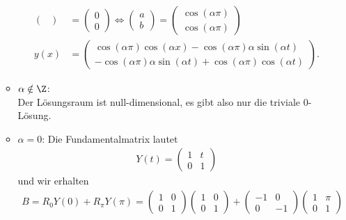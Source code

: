 \begin{solution}
\begin{enumerate}[label = \textbf{\alph*)}]
\begin{itemize}
\begin{align*}
\begin{pmatrix}
        \end{pmatrix}
        &= \begin{pmatrix}
          0 \\ 0
        \end{pmatrix} \iff
        \begin{pmatrix}
          a \\ b
        \end{pmatrix}
        = \begin{pmatrix}
          \cos(\alpha \pi) \\ \cos(\alpha \pi)
        \end{pmatrix}\\
        y(x) &=
        \begin{pmatrix}
          \cos(\alpha \pi)\cos(\alpha x) - \cos(\alpha \pi)\alpha\sin(\alpha t) \\
          -\cos(\alpha \pi)\alpha\sin(\alpha t) + \cos(\alpha \pi)\cos(\alpha t)
        \end{pmatrix}.
      \end{align*}
    \item $\alpha \notin \Z$: \\
      Der Lösungsraum ist null-dimensional, es gibt also nur die triviale $0$-Lösung.
    \item $\alpha = 0$:
      Die Fundamentalmatrix lautet
      \begin{align*}
        Y(t) = \begin{pmatrix}
          1 & t \\ 0 & 1
        \end{pmatrix}
      \end{align*}
      und wir erhalten
      \begin{align*}
        B = R_0Y(0) + R_{\pi}Y(\pi) =
        \begin{pmatrix}
          1 & 0 \\ 0 & 1
        \end{pmatrix}
        \begin{pmatrix}
          1 & 0  \\ 0 & 1
        \end{pmatrix}
        + \begin{pmatrix}
          -1 & 0 \\ 0 & -1
        \end{pmatrix}
        \begin{pmatrix}
          1 & \pi  \\ 0 & 1
        \end{pmatrix}

\end{align*}
\end{itemize}
\end{enumerate}
\end{solution}
